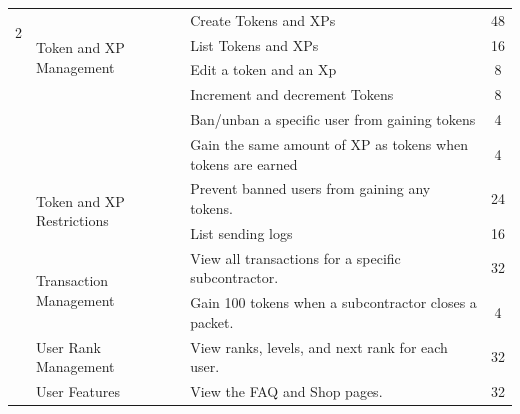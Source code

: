 \begin{longtable}{ | m{}  | m{} | m{} | c | }
    \hline
    \multirow[t]{2}{5em}{2} & \multirow{4}{5em}{Token and XP Management}  & Create  Tokens and XPs            & 48                          \\
    \cline{3-4}
                            &                                                      & List Tokens and XPs                & 16                          \\
    \cline{3-4}
                            &                                                      & Edit a token  and an Xp              & 8                           \\
    \cline{3-4}
                            &                                                      & Increment and decrement Tokens             & 8                           \\
    \cline{3-4}                        &                  & Ban/unban a specific user from gaining tokens & 4                          \\
    \cline{3-4}                        &                  & Gain the same amount of XP as tokens when tokens are earned & 4    \\
    \cline{2-4}
                            & \multirow{2}{5em}{Token and XP Restrictions}              & Prevent banned users from gaining any tokens.     & 24                          \\
    \cline{3-4}
                            &                                                      & List sending logs            & 16                          \\
    \cline{2-4}
                            & \multirow{2}{5em}{Transaction Management}                                           & View all transactions for a specific subcontractor.                & 32                          \\
    \cline{3-4}                        &                  & Gain 100 tokens when a subcontractor closes a packet. & 4                          \\
                     
    \cline{2-4}
                            & {User Rank Management}                                           & View ranks, levels, and next rank for each user.                & 32                          \\

                 
    \cline{2-4}
                              & {User Features}                                           & View the FAQ and Shop pages.                & 32                          \\

    \hline
\end{longtable}

